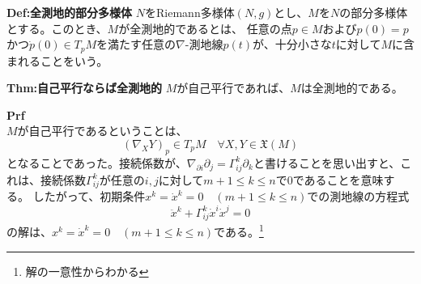 \documentclass[a4paper,11pt]{jsarticle}
\numberwithin{equation}{section}
\begin{document}
\begin{itembox}[l]{\textbf{Def:全測地的部分多様体}}
    $N$をRiemann多様体$(N,g)$とし、$M$を$N$の部分多様体とする。このとき、$M$が全測地的であるとは、
    任意の点$p \in M$および$p(0) =p$かつ$\dot{p}(0) \in T_pM$を満たす任意の$\nabla$-測地線$p(t)$が、十分小さな$t$に対して$M$に含まれることをいう。
\end{itembox}

\begin{itembox}[l]{\textbf{Thm:自己平行ならば全測地的}}
    $M$が自己平行であれば、$M$は全測地的である。
\end{itembox}
\textbf{Prf}\\
$M$が自己平行であるということは、
\begin{equation}
    (\nabla_X Y)_p \in T_pM \quad \forall X,Y \in \mathfrak{X}(M)
\end{equation}
となることであった。接続係数が、$\nabla_{\partial{i}}\partial_{j} = \Gamma_{ij}^k\partial_{k}$と書けることを思い出すと、これは、接続係数$\Gamma_{ij}^k$が任意の$i,j$に対して$m+1 \leq k \leq n$で$0$であることを意味する。
したがって、初期条件$x^k =\dot{x}^k = 0 \quad (m+1 \leq k \leq n)$での測地線の方程式
\begin{equation}
    \ddot{x}^k + \Gamma_{ij}^k \dot{x}^i \dot{x}^j = 0
\end{equation}
の解は、$x^k = \dot{x}^k = 0 \quad (m+1 \leq k \leq n)$である。\footnote{解の一意性からわかる}\hfill\qedsymbol
\end{document}
